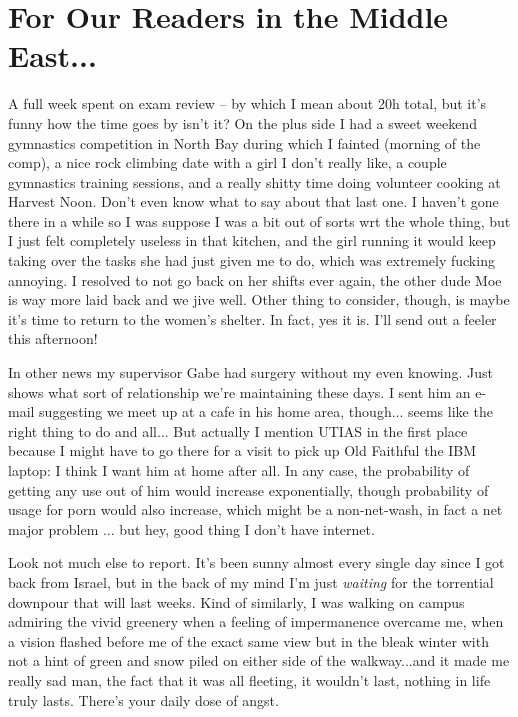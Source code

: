 \documentclass[12pt]{article}
\begin{document}
\newpage

\section*{For Our Readers in the Middle East...}
A full week spent on exam review -- by which I mean about 20h total, but it's funny how the time goes by isn't it? On the plus side I had a sweet weekend gymnastics competition in North Bay during which I fainted (morning of the comp), a nice rock climbing date with a girl I don't really like, a couple gymnastics training sessions, and a really shitty time doing volunteer cooking at Harvest Noon. Don't even know what to say about that last one. I haven't gone there in a while so I was suppose I was a bit out of sorts wrt the whole thing, but I just felt completely useless in that kitchen, and the girl running it would keep taking over the tasks she had just given me to do, which was extremely fucking annoying. I resolved to not go back on her shifts ever again, the other dude Moe is way more laid back and we jive well. Other thing to consider, though, is maybe it's time to return to the women's shelter. In fact, yes it is. I'll send out a feeler this afternoon!

In other news my supervisor Gabe had surgery without my even knowing. Just shows what sort of relationship we're maintaining these days. I sent him an e-mail suggesting we meet up at a cafe in his home area, though... seems like the right thing to do and all... But actually I mention UTIAS in the first place because I might have to go there for a visit to pick up Old Faithful the IBM laptop: I think I want him at home after all. In any case, the probability of getting any use out of him would increase exponentially, though probability of usage for porn would also increase, which might be a non-net-wash, in fact a net major problem ... but hey, good thing I don't have internet. 

Look not much else to report. It's been sunny almost every single day since I got back from Israel, but in the back of my mind I'm just \textit{waiting} for the torrential downpour that will last weeks. Kind of similarly, I was walking on campus admiring the vivid greenery when a feeling of impermanence overcame me, when a vision flashed before me of the exact same view but in the bleak winter with not a hint of green and snow piled on either side of the walkway...and it made me really sad man, the fact that it was all fleeting, it wouldn't last, nothing in life truly lasts. There's your daily dose of angst. 
\end{document}
